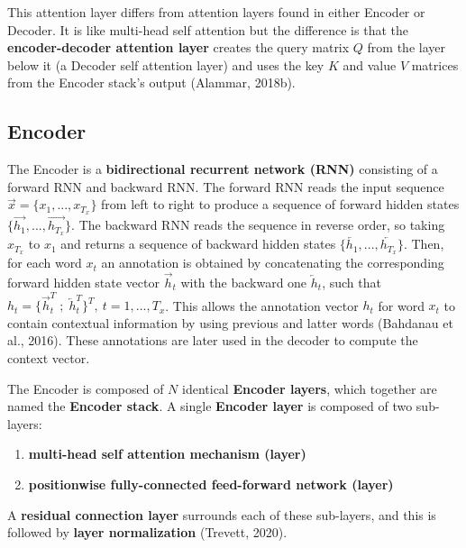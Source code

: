 This attention layer differs from attention layers found in either Encoder or Decoder. It is like multi-head self attention but the difference is that the \textbf{encoder-decoder attention layer} creates the query matrix $Q$ from the layer below it (a Decoder self attention layer) and uses the key $K$ and value $V$ matrices from the Encoder stack's output (Alammar, 2018b). 



\subsection{Encoder} \label{sec:TransformerEncoder}

The Encoder is a \textbf{bidirectional recurrent network (RNN)} consisting of a forward RNN and backward RNN. The forward RNN reads the input sequence $\overrightarrow{x} = \Big\{ x_1,...,x_{T_x} \Big\}$ from left to right to produce a sequence of forward hidden states $\Big\{ \overrightarrow{h_1},..., \overrightarrow{h_{T_x}} \Big\}$. The backward RNN reads the sequence in reverse order, so taking $x_{T_x}$ to $x_1$ and returns a sequence of backward hidden states $\Big\{ \overleftarrow{h_1},..., \overleftarrow{h_{T_x}} \Big\}$. Then, for each word $x_t$ an annotation is obtained by concatenating the corresponding forward hidden state vector $\overrightarrow{h}_t$ with the backward one $\overleftarrow{h}_t$, such that $h_t = \Big \{ \overrightarrow{h}_t^T \; ; \; \overleftarrow{h}_t^T \Big\}^T , \: t=1,...,T_x$. This allows the annotation vector $h_t$ for word $x_t$ to contain contextual information by using previous and latter words (Bahdanau et al., 2016). These annotations are later used in the decoder to compute the context vector. 

The Encoder is composed of $N$ identical \textbf{Encoder layers}, which together are named the \textbf{Encoder stack}. A single \textbf{Encoder layer}  is composed of two sub-layers: 
\begin{enumerate}
    \item \textbf{multi-head self attention mechanism (layer)}
    
    \item \textbf{positionwise fully-connected feed-forward network (layer)}
\end{enumerate}

A \textbf{residual connection layer} surrounds each of these sub-layers, and this is followed by \textbf{layer normalization} (Trevett, 2020).  




